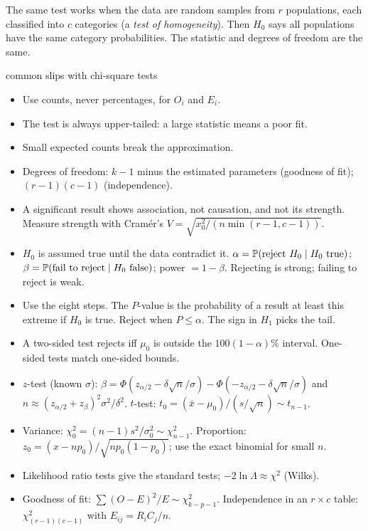 The same test works when the data are random samples from $r$ populations, each classified into $c$ categories (a \emph{test of homogeneity}). Then $H_0$ says all populations have the same category probabilities. The statistic and degrees of freedom are the same.

\begin{interview}{common slips with chi-square tests}
\begin{itemize}
  \item Use counts, never percentages, for $O_i$ and $E_i$.
  \item The test is always upper-tailed: a large statistic means a poor fit.
  \item Small expected counts break the approximation.
  \item Degrees of freedom: $k-1$ minus the estimated parameters (goodness of fit); $(r-1)(c-1)$ (independence).
  \item A significant result shows association, not causation, and not its strength. Measure strength with Cram\'er's $V=\sqrt{x_0^2/(n\min(r-1,c-1))}$.
\end{itemize}
\end{interview}

\begin{summarybox}
\begin{itemize}
  \item $H_0$ is assumed true until the data contradict it. $\alpha=\mathbb{P}(\text{reject }H_0\mid H_0\text{ true})$; $\beta=\mathbb{P}(\text{fail to reject}\mid H_0\text{ false})$; power $=1-\beta$. Rejecting is strong; failing to reject is weak.
  \item Use the eight steps. The $P$-value is the probability of a result at least this extreme if $H_0$ is true. Reject when $P\le\alpha$. The sign in $H_1$ picks the tail.
  \item A two-sided test rejects iff $\mu_0$ is outside the $100(1-\alpha)\%$ interval. One-sided tests match one-sided bounds.
  \item $z$-test (known $\sigma$): $\beta=\Phi(z_{\alpha/2}-\delta\sqrt n/\sigma)-\Phi(-z_{\alpha/2}-\delta\sqrt n/\sigma)$ and $n\approx(z_{\alpha/2}+z_\beta)^2\sigma^2/\delta^2$. $t$-test: $t_0=(\bar{x}-\mu_0)/(s/\sqrt n)\sim t_{n-1}$.
  \item Variance: $\chi_0^2=(n-1)s^2/\sigma_0^2\sim\chi^2_{n-1}$. Proportion: $z_0=(x-np_0)/\sqrt{np_0(1-p_0)}$; use the exact binomial for small $n$.
  \item Likelihood ratio tests give the standard tests; $-2\ln\Lambda\approx\chi^2$ (Wilks).
  \item Goodness of fit: $\sum(O-E)^2/E\sim\chi^2_{k-p-1}$. Independence in an $r\times c$ table: $\chi^2_{(r-1)(c-1)}$ with $E_{ij}=R_iC_j/n$.
\end{itemize}
\end{summarybox}

